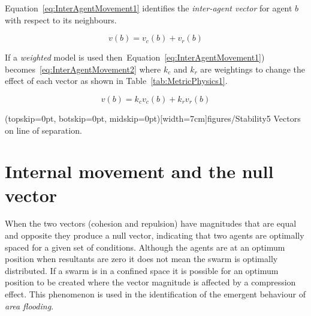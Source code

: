 \documentclass{ieeeaccess}
\begin{document}
Equation~\ref{eq:InterAgentMovement1} identifies the \textit{inter-agent vector} for agent $b$ with respect to its neighbours.

\begin{equation}\label{eq:InterAgentMovement1}
v(b) = v_{c}(b) + v_{r}(b)
\end{equation}

If a \textit{weighted} model is used then~Equation~\ref{eq:InterAgentMovement1}) becomes~\ref{eq:InterAgentMovement2} where $k_c$ and $k_r$ are weightings to change the effect of each vector as shown in Table~\ref{tab:MetricPhysics1}.

\begin{equation}\label{eq:InterAgentMovement2}
v(b) = k_cv_{c}(b) + k_rv_{r}(b)
\end{equation}


\Figure[t!](topskip=0pt, botskip=0pt, midskip=0pt)[width=7cm]{figures/Stability5}
{Vectors on line of separation.\label{methods:Stability5}}


\section{Internal movement and the null vector}\label{Section:StabilityNullVector}
When the two vectors (cohesion and repulsion) have magnitudes that are equal and opposite they produce a null vector, indicating that two agents are optimally spaced for a given set of conditions. Although the agents are at an optimum position when resultants are zero it does not mean the swarm is optimally distributed. If a swarm is in a confined space it is possible for an optimum position to be created where the vector magnitude is affected by a compression effect. This phenomenon is used in the identification of the emergent behaviour of \textit{area flooding}.  
\end{document}
